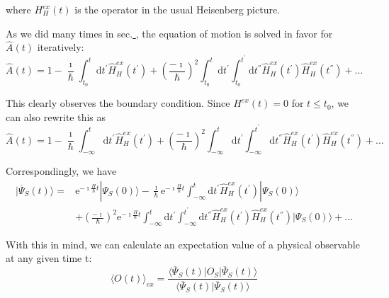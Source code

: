 where $H_H^{ex}(t)$ is the operator in the usual Heisenberg picture.

As we did many times in sec.\underline{    }, the equation of motion is solved in favor for $\hat{A}(t)$ iteratively:
\[ \hat{A}(t) = 1-\frac{\imath}{\hbar} \int_{t_0}^{t} \mathrm{d} t^{'} \hat{H}_{H}^{ex}(t^{'}) + \left( \frac{-\imath}{\hbar} \right)^2 \int_{t_0}^{t} \mathrm{d} t^{'} \int_{t_0}^{t^{'}} \mathrm{d} t^{''} \hat{H}_H^{ex}(t^{'}) \hat{H}_H^{ex}(t^{''}) + \ldots \]

This clearly observes the boundary condition. Since $H^{ex}(t) = 0$ for $t \leq t_0$, we can also rewrite this as
\begin{equation} \label{Eqs3.1.5}
\hat{A}(t) = 1-\frac{\imath}{\hbar} \int_{-\infty}^{t} \mathrm{d} t^{'} \hat{H}_{H}^{ex}(t^{'}) + \left( \frac{-\imath}{\hbar} \right)^2 \int_{-\infty}^{t} \mathrm{d} t^{'} \int_{-\infty}^{t^{'}} \mathrm{d} t^{''} \hat{H}_H^{ex}(t^{'}) \hat{H}_H^{ex}(t^{''}) + \ldots
\end{equation}

Correspondingly, we have
\begin{equation*} \label{Eqs3.1.5'} \tag{3.1.5'} \begin{split}
| \overline{\Psi}_S(t) \rangle =& \mathrm{e}^{-\imath \frac{H}{\hbar} t} | \Psi_S(0) \rangle - \frac{\imath}{\hbar}\mathrm{e}^{-\imath \frac{H}{\hbar}t} \int_{-\infty}^{t} \mathrm{d} t^{'} \hat{H}_{H}^{ex}(t^{'}) | \Psi_S(0) \rangle \\
&+ \left( \frac{-\imath}{\hbar} \right)^2 \mathrm{e}^{-\imath \frac{H}{\hbar}t} \int_{-\infty}^{t} \mathrm{d} t^{'} \int_{-\infty}^{t^{'}} \mathrm{d} t^{''} \hat{H}_H^{ex}(t^{'}) \hat{H}_H^{ex}(t^{''}) | \Psi_S(0) \rangle + \ldots
\end{split}\end{equation*}

With this in mind, we can calculate an expectation value of a physical observable at any given time t:
\begin{equation} \label{Eqs3.1.6}
\langle O(t) \rangle_{ex} = \frac{\langle \overline{\Psi}_S(t)|O_S|\overline{\Psi}_S(t)\rangle}{\langle \overline{\Psi}_S(t)|\overline{\Psi}_S(t)\rangle}
\end{equation}

